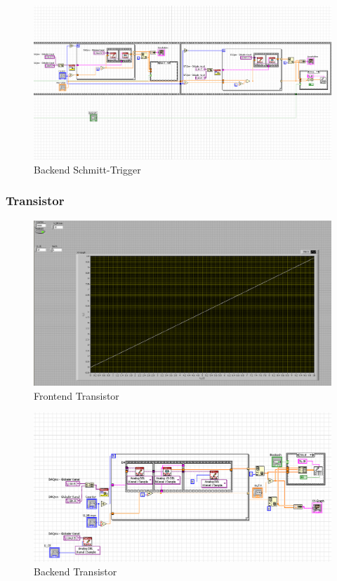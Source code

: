 \documentclass[12pt,twoside,a4paper]{scrartcl}
\begin{document}
			\begin{figure}[H]
				\centering
				\includegraphics[width =  \textwidth]{Pictures/Programme/Backend_Schmitt}
				\caption{Backend Schmitt-Trigger}
			\end{figure}

		\subsubsection{Transistor}
			\label{Programme::Transistor}
			\begin{figure}[H]
				\centering
				\includegraphics[width =  \textwidth]{Pictures/Programme/Frontend_Transistor}
				\caption{Frontend Transistor}
			\end{figure}

			\begin{figure}[H]
				\centering
				\includegraphics[width =  \textwidth]{Pictures/Programme/Backend_Transistor}
				\caption{Backend Transistor}
			\end{figure}
\end{document}
